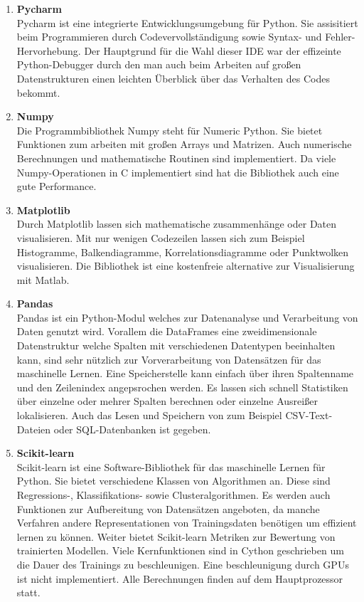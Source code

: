 \begin{enumerate}

\item[] \textbf{Pycharm}\hfill \\
Pycharm ist eine integrierte Entwicklungsumgebung f{\"u}r Python. 
Sie assisitiert beim Programmieren durch Codevervollst{\"a}ndigung sowie Syntax- und Fehler-Hervorhebung. Der Hauptgrund f{\"u}r die Wahl dieser IDE war der effizeinte Python-Debugger durch den man auch beim Arbeiten auf gro{\ss}en Datenstrukturen einen leichten {\"U}berblick {\"u}ber das Verhalten des Codes bekommt.


\item[] \textbf{Numpy}\hfill \\
Die Programmbibliothek Numpy steht f{\"u}r Numeric Python. Sie bietet Funktionen zum arbeiten mit gro{\ss}en Arrays und Matrizen. Auch numerische Berechnungen und mathematische Routinen sind implementiert. Da viele Numpy-Operationen in C implementiert sind hat die Bibliothek auch eine gute Performance.


\item[] \textbf{Matplotlib}\hfill \\
Durch Matplotlib lassen sich mathematische zusammenh{\"a}nge oder Daten visualisieren. 
Mit nur wenigen Codezeilen lassen sich zum Beispiel Histogramme, Balkendiagramme, Korrelationsdiagramme oder Punktwolken visualisieren. Die Bibliothek ist eine kostenfreie alternative zur Visualisierung mit Matlab.


\item[] \textbf{Pandas}\hfill \\
Pandas ist ein Python-Modul welches zur Datenanalyse und Verarbeitung von Daten genutzt wird.
Vorallem die DataFrames eine zweidimensionale Datenstruktur welche Spalten mit verschiedenen Datentypen beeinhalten kann, sind sehr n{\"u}tzlich zur Vorverarbeitung von Datens{\"a}tzen f{\"u}r das maschinelle Lernen. Eine Speicherstelle kann einfach {\"u}ber ihren Spaltenname und den Zeilenindex angepsrochen werden. Es lassen sich schnell Statistiken {\"u}ber einzelne oder mehrer Spalten berechnen oder einzelne Ausrei{\ss}er lokalisieren. Auch das Lesen und Speichern von zum Beispiel CSV-Text-Dateien oder SQL-Datenbanken ist gegeben.

\item[] \textbf{Scikit-learn}\hfill \\
Scikit-learn ist eine Software-Bibliothek f\"ur das maschinelle Lernen f{\"u}r Python.
Sie bietet verschiedene Klassen von Algorithmen an. Diese sind Regressions-, Klassifikations- sowie Clusteralgorithmen. Es werden auch Funktionen zur Aufbereitung von Datens{\"a}tzen angeboten, da manche Verfahren andere Representationen von Trainingsdaten ben{\"o}tigen um effizient lernen zu k{\"o}nnen. Weiter bietet Scikit-learn Metriken zur Bewertung von trainierten Modellen. Viele Kernfunktionen sind in Cython geschrieben um die Dauer des Trainings zu beschleunigen. Eine beschleunigung durch GPUs ist nicht implementiert. Alle Berechnungen finden auf dem Hauptprozessor statt.


\end{enumerate}
